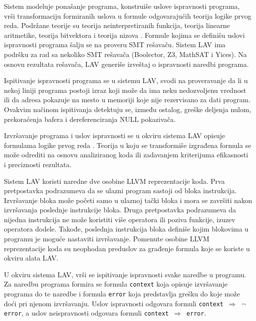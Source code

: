 \documentclass[12pt,oneside]{memoir}
\begin{document}
Sistem modeluje ponašanje programa, konstruiše uslove ispravnosti programa, vrši transformaciju formiranih uslova u formule odgovarajućih teorija logike prvog reda. Podržane teorije su teorija neinterpretiranih funkcija, teorija linearne aritmetike, teorija bitvektora i teorija nizova \cite{Barrett}. Formule kojima se definišu uslovi ispravnosti programa šalju se na proveru SMT rešavaču. Sistem LAV ima podršku za rad sa nekoliko SMT rešavača (Boolector, Z3, MathSAT i Yices). Na osnovu rezultata rešavača, LAV generiše izveštaj o ispravnosti naredbi programa.
\par

Ispitivanje ispravnosti programa se u sistemu LAV, svodi na proveravanje da li u nekoj liniji programa postoji izraz koji može da ima neku nedozvoljenu vrednost ili da adresa pokazuje na mesto u memoriji koje nije rezervisano za dati program. Ovakvim načinom ispitivanja detektuju se, između ostalog, greške deljenja nulom, prekoraćenja bafera i dereferenciranja NULL pokazivača.

\par

Izvršavanje programa i uslov ispravnosti se u okviru sistema LAV opisuje formulama logike prvog reda \cite{vstteLAV12}. Teorija u koju se transformiše izgrađena formula se može odrediti na osnovu analiziranog koda ili zadavanjem kriterijuma efikasnosti i preciznosti rezultata.
\par

Sistem LAV koristi naredne dve osobine LLVM reprezentacije koda. Prva pretpostavka podrazumeva da se ulazni program sastoji od bloka instrukcija. Izvršavanje bloka može početi samo u ulaznoj tački bloka i mora se završiti nakon izvršavanja poslednje instrukcije bloka. Druga pretpostavka podrazumeva da nijedna instrukcija ne može koristiti više operatora ili poziva funkcije, izuzev operatora dodele. Takođe, poslednja instrukcija bloka definiše kojim blokovima u programu je moguće nastaviti izvršavanje. Pomenute osobine LLVM reprezentacije koda su neophodan preduslov za građenje formula koje se koriste u okviru alata LAV.
\par
U okviru sistema LAV, vrši se ispitivanje ispravnosti svake naredbe u programu. 
Za naredbu programa formira se formula \texttt{context} koja opisuje izvršavanje programa do te naredbe i formula \texttt{error} koja predstavlja grešku do koje može doći pri njenom izvršavanju. Uslov ispravnosti odgovara formuli \texttt{context $\Rightarrow$ $\neg$ error}, a uslov neispravnosti odgovara formuli \texttt{context $\Rightarrow$ error}. 
\end{document}
